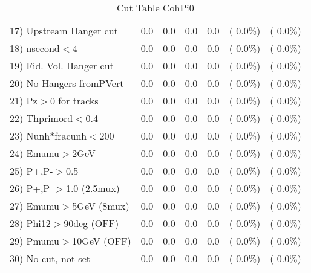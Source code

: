 \begin{table}[h!]
\begin{tabular}{||l||r|r|r|r|r|r||}
 17) Upstream Hanger cut  &          0.0 &          0.0 &          0.0 &          0.0 & (  0.0\%) & (  0.0\%) \\
 18) nsecond$<$4          &          0.0 &          0.0 &          0.0 &          0.0 & (  0.0\%) & (  0.0\%) \\
 19) Fid. Vol. Hanger cut &          0.0 &          0.0 &          0.0 &          0.0 & (  0.0\%) & (  0.0\%) \\
 20) No Hangers fromPVert &          0.0 &          0.0 &          0.0 &          0.0 & (  0.0\%) & (  0.0\%) \\
 21) Pz$>$0 for tracks    &          0.0 &          0.0 &          0.0 &          0.0 & (  0.0\%) & (  0.0\%) \\
 22) Thprimord$<$0.4      &          0.0 &          0.0 &          0.0 &          0.0 & (  0.0\%) & (  0.0\%) \\
 23) Nunh*fracunh$<$200   &          0.0 &          0.0 &          0.0 &          0.0 & (  0.0\%) & (  0.0\%) \\
 24) Emumu$>$2GeV         &          0.0 &          0.0 &          0.0 &          0.0 & (  0.0\%) & (  0.0\%) \\
 25) P+,P-$>$0.5          &          0.0 &          0.0 &          0.0 &          0.0 & (  0.0\%) & (  0.0\%) \\
 26) P+,P-$>$1.0 (2.5mux) &          0.0 &          0.0 &          0.0 &          0.0 & (  0.0\%) & (  0.0\%) \\
 27) Emumu$>$5GeV  (8mux) &          0.0 &          0.0 &          0.0 &          0.0 & (  0.0\%) & (  0.0\%) \\
 28) Phi12$>$90deg  (OFF) &          0.0 &          0.0 &          0.0 &          0.0 & (  0.0\%) & (  0.0\%) \\
 29) Pmumu$>$10GeV  (OFF) &          0.0 &          0.0 &          0.0 &          0.0 & (  0.0\%) & (  0.0\%) \\
 30) No cut, not set      &          0.0 &          0.0 &          0.0 &          0.0 & (  0.0\%) & (  0.0\%) \\
 \hline
 \hline
 \end{tabular}
 \caption{Cut Table  CohPi0   }
 \label{tab-cutheavy_neutrino_0.500}
 \end{table}
